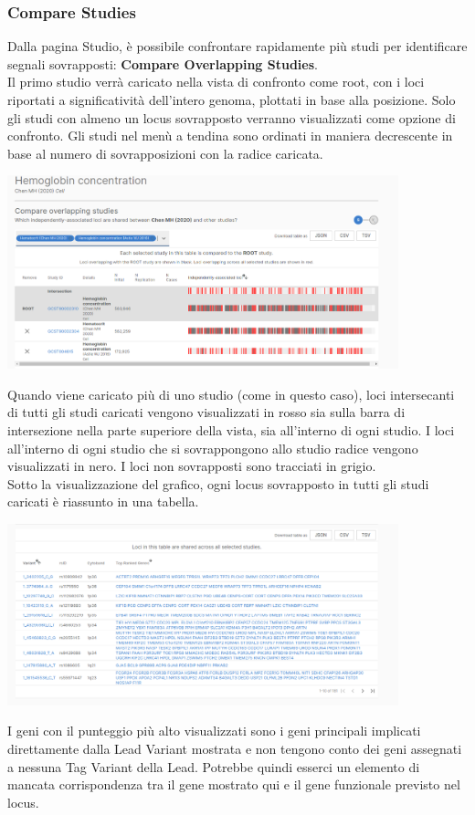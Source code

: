 \documentclass{article}
\begin{document}
\subsubsection{Compare Studies}
Dalla pagina Studio, è possibile confrontare rapidamente più studi per identificare segnali sovrapposti: \textbf{Compare Overlapping Studies}.\\
Il primo studio verrà caricato nella vista di confronto come root, con i loci riportati a significatività dell'intero genoma, plottati in base alla posizione. Solo gli studi con almeno un locus sovrapposto verranno visualizzati come opzione di confronto. Gli studi nel menù a tendina sono ordinati in maniera decrescente in base al numero di sovrapposizioni con la radice caricata.
\begin{center}
    \includegraphics[width=0.85\textwidth]{figures/7-Compare Studies.png}
\end{center}
Quando viene caricato più di uno studio (come in questo caso), loci intersecanti di tutti gli studi caricati vengono visualizzati in rosso sia sulla barra di intersezione nella parte superiore della vista, sia all'interno di ogni studio. I loci all'interno di ogni studio che si sovrappongono allo studio radice vengono visualizzati in nero. I loci non sovrapposti sono tracciati in grigio.\\
Sotto la visualizzazione del grafico, ogni locus sovrapposto in tutti gli studi caricati è riassunto in una tabella.
\begin{center}
    \includegraphics[width=0.85\textwidth]{figures/8-Compare Studies.png}
\end{center}
I geni con il punteggio più alto visualizzati sono i geni principali implicati direttamente dalla Lead Variant mostrata e non tengono conto dei geni assegnati a nessuna Tag Variant della Lead. Potrebbe quindi esserci un elemento di mancata corrispondenza tra il gene mostrato qui e il gene funzionale previsto nel locus.
\end{document}
